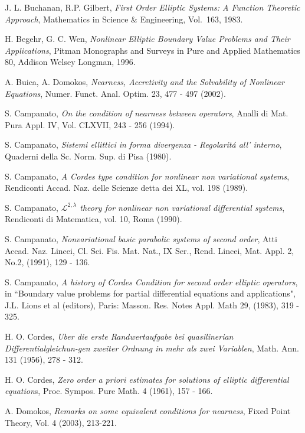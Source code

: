 \documentclass{amsart}
\theoremstyle{definition}
\numberwithin{equation}{section}
\begin{document}

\begin{thebibliography}{30}
 J. L. Buchanan, R.P. Gilbert, \emph{First Order Elliptic Systems:  A Function Theoretic Approach}, Mathematics in Science \& Engineering, Vol.\ 163, 1983.

 H. Begehr, G. C. Wen, \emph{Nonlinear Elliptic Boundary Value Problems and Their Applications}, Pitman Monographs and Surveys in Pure and Applied Mathematics 80, Addison Welsey Longman, 1996.

 A. Buica, A. Domokos, \emph{Nearness, Accretivity and the Solvability of Nonlinear Equations}, Numer. Funct. Anal. Optim. 23, 477 - 497 (2002).

 S. Campanato, \emph{On the condition of nearness between operators},
Analli di Mat. Pura Appl. IV, Vol. CLXVII, 243 - 256 (1994).

 S. Campanato, \emph{Sistemi ellittici in forma divergenza - Regolarit\'a all' interno},
Quaderni della Sc. Norm. Sup. di Pisa (1980).

 S. Campanato, \emph{A Cordes type condition for nonlinear non variational
systems}, Rendiconti Accad. Naz. delle Scienze detta dei XL, vol. 198 (1989).

 S. Campanato, \emph{$\mathcal{L}^{2,\lambda}$ theory for nonlinear non variational differential systems}, Rendiconti di Matematica, vol. 10, Roma (1990).

 S. Campanato, \emph{Nonvariational basic parabolic systems of second order},
Atti Accad. Naz. Lincei, Cl. Sci. Fis. Mat. Nat., IX Ser., Rend. Lincei, Mat. Appl. 2, No.2, (1991), 129 - 136.

 S. Campanato, \emph{A history of Cordes Condition for second order elliptic operators}, in ``Boundary value problems for partial differential equations and applications", J.L. Lions et al (editors), Paris: Masson. Res. Notes Appl. Math 29, (1983), 319 - 325.

 H. O. Cordes, \emph{Uber die erste Randwertaufgabe bei quasilinerian Differentialgleichun-gen zweiter Ordnung in mehr als zwei Variablen}, Math. Ann. 131 (1956), 278 - 312.

 H. O. Cordes, \emph{Zero order a priori estimates for solutions of elliptic differential
equation}s, Proc. Sympos. Pure Math. 4 (1961), 157 - 166.

 A. Domokos, \emph{Remarks on some equivalent conditions for nearness}, Fixed Point Theory, Vol. 4 (2003), 213-221.


\end{thebibliography}
\end{document}
